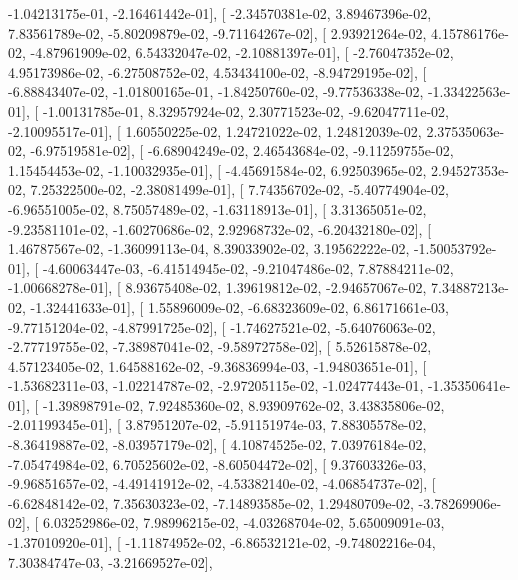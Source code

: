 \documentclass{article}
\begin{document}
         -1.04213175e-01,  -2.16461442e-01],
       [ -2.34570381e-02,   3.89467396e-02,   7.83561789e-02,
         -5.80209879e-02,  -9.71164267e-02],
       [  2.93921264e-02,   4.15786176e-02,  -4.87961909e-02,
          6.54332047e-02,  -2.10881397e-01],
       [ -2.76047352e-02,   4.95173986e-02,  -6.27508752e-02,
          4.53434100e-02,  -8.94729195e-02],
       [ -6.88843407e-02,  -1.01800165e-01,  -1.84250760e-02,
         -9.77536338e-02,  -1.33422563e-01],
       [ -1.00131785e-01,   8.32957924e-02,   2.30771523e-02,
         -9.62047711e-02,  -2.10095517e-01],
       [  1.60550225e-02,   1.24721022e-02,   1.24812039e-02,
          2.37535063e-02,  -6.97519581e-02],
       [ -6.68904249e-02,   2.46543684e-02,  -9.11259755e-02,
          1.15454453e-02,  -1.10032935e-01],
       [ -4.45691584e-02,   6.92503965e-02,   2.94527353e-02,
          7.25322500e-02,  -2.38081499e-01],
       [  7.74356702e-02,  -5.40774904e-02,  -6.96551005e-02,
          8.75057489e-02,  -1.63118913e-01],
       [  3.31365051e-02,  -9.23581101e-02,  -1.60270686e-02,
          2.92968732e-02,  -6.20432180e-02],
       [  1.46787567e-02,  -1.36099113e-04,   8.39033902e-02,
          3.19562222e-02,  -1.50053792e-01],
       [ -4.60063447e-03,  -6.41514945e-02,  -9.21047486e-02,
          7.87884211e-02,  -1.00668278e-01],
       [  8.93675408e-02,   1.39619812e-02,  -2.94657067e-02,
          7.34887213e-02,  -1.32441633e-01],
       [  1.55896009e-02,  -6.68323609e-02,   6.86171661e-03,
         -9.77151204e-02,  -4.87991725e-02],
       [ -1.74627521e-02,  -5.64076063e-02,  -2.77719755e-02,
         -7.38987041e-02,  -9.58972758e-02],
       [  5.52615878e-02,   4.57123405e-02,   1.64588162e-02,
         -9.36836994e-03,  -1.94803651e-01],
       [ -1.53682311e-03,  -1.02214787e-02,  -2.97205115e-02,
         -1.02477443e-01,  -1.35350641e-01],
       [ -1.39898791e-02,   7.92485360e-02,   8.93909762e-02,
          3.43835806e-02,  -2.01199345e-01],
       [  3.87951207e-02,  -5.91151974e-03,   7.88305578e-02,
         -8.36419887e-02,  -8.03957179e-02],
       [  4.10874525e-02,   7.03976184e-02,  -7.05474984e-02,
          6.70525602e-02,  -8.60504472e-02],
       [  9.37603326e-03,  -9.96851657e-02,  -4.49141912e-02,
         -4.53382140e-02,  -4.06854737e-02],
       [ -6.62848142e-02,   7.35630323e-02,  -7.14893585e-02,
          1.29480709e-02,  -3.78269906e-02],
       [  6.03252986e-02,   7.98996215e-02,  -4.03268704e-02,
          5.65009091e-03,  -1.37010920e-01],
       [ -1.11874952e-02,  -6.86532121e-02,  -9.74802216e-04,
          7.30384747e-03,  -3.21669527e-02],
\end{document}
